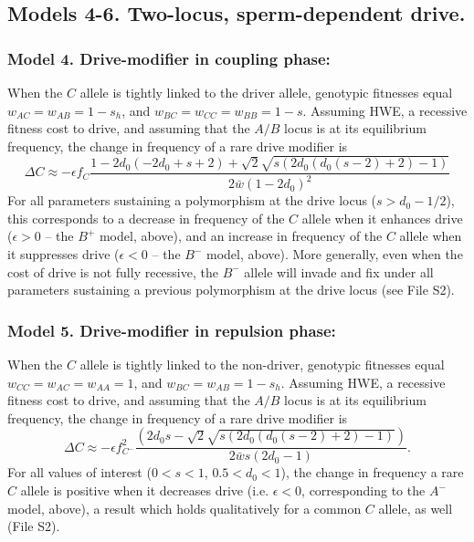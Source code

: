 \documentclass[12pt,letterpaper]{article}
\begin{document}
\subsection*{Models 4-6. Two-locus, sperm-dependent drive.} 

\subsubsection*{Model 4. Drive-modifier in coupling phase:}
When the $C$ allele is tightly linked to the driver allele, 
	genotypic fitnesses equal $w_{AC}=w_{AB}=1-s_h$, and $w_{BC}=w_{CC}=w_{BB}=1-s$. 
Assuming HWE, a recessive fitness cost to drive, and assuming that the $A/B$ locus is at its equilibrium frequency, the change in frequency of a rare drive modifier is
\begin{equation}
	\Delta C\approx -\epsilon f_C \frac{ 1-2 d_0 (-2 d_0+s+2)+\sqrt{2} \sqrt{s (2 d_0 (d_0(s-2)+2)-1)}}{2 \bar{w}(1-2 d_0)^2}
	\label{coupling}
\end{equation}
For all parameters sustaining a polymorphism at the drive locus ($s>d_0-1/2$), this corresponds to a decrease in frequency of the $C$ allele when it enhances drive ($\epsilon >0$ -- the $B^+$ model, above), 
	and an increase in frequency of the $C$ allele when it suppresses drive ($\epsilon <0$ -- the $B^-$ model, above). 
More generally, even when the cost of drive is not fully recessive, the $B^-$ allele will invade and fix under all parameters sustaining a previous polymorphism at the drive locus (see File S2). 


\subsubsection*{Model 5. Drive-modifier in repulsion phase:}
When the $C$ allele is tightly linked to the non-driver, 
	genotypic fitnesses equal $w_{CC}=w_{AC}=w_{AA}=1$, and $w_{BC}=w_{AB}=1-s_h$. 
Assuming HWE, a recessive fitness cost to drive, and assuming that the $A/B$ locus is at its equilibrium frequency, the change in frequency of a rare drive modifier is
\begin{equation}
	\Delta C \approx -\epsilon f_{C^-}^2 \frac{ \left(2 d_0 s-\sqrt{2} \sqrt{s (2 d_0 (d_0 (s-2)+2)-1)}\right)}{2\bar{w}s (2 d_0 -1) }. \label{A-}
\end{equation}
For all values of interest ($0<s<1$, $0.5<d_0<1$), the change in frequency a rare $C$ allele is positive when it decreases drive (i.e. $\epsilon <0$, corresponding to the $A^-$ model, above), a result which holds qualitatively for a common $C$ allele, as well (File S2). 
\end{document}
